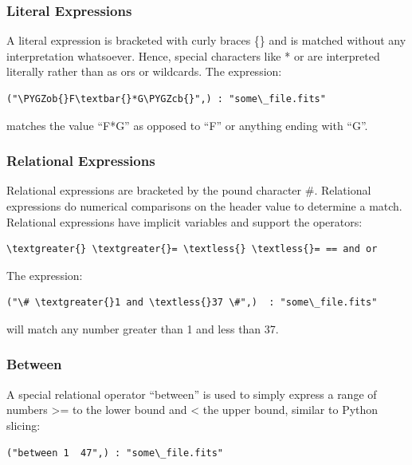 \documentclass[letterpaper,10pt,english]{sphinxmanual}
\def\PYGZob{\char`\{}
\def\PYGZcb{\char`\}}
\begin{document}
\subsubsection{Literal Expressions}
\label{rmap_syntax:literal-expressions}
A literal expression is bracketed with curly braces \{\} and is matched without
any interpretation whatsoever.   Hence,  special characters like * or \textbar{} are
interpreted literally rather than as ors or wildcards.  The expression:

\begin{Verbatim}[commandchars=\\\{\}]
("\PYGZob{}F\textbar{}*G\PYGZcb{}",) : "some\_file.fits"
\end{Verbatim}

matches the value ``F\textbar{}*G'' as opposed to ``F'' or anything ending with ``G''.


\subsubsection{Relational Expressions}
\label{rmap_syntax:relational-expressions}
Relational expressions are bracketed by the pound character \#.   Relational
expressions do numerical comparisons on the header value to determine a match.
Relational expressions have implicit variables and support the operators:

\begin{Verbatim}[commandchars=\\\{\}]
\textgreater{} \textgreater{}= \textless{} \textless{}= == and or
\end{Verbatim}

The expression:

\begin{Verbatim}[commandchars=\\\{\}]
("\# \textgreater{}1 and \textless{}37 \#",)  : "some\_file.fits"
\end{Verbatim}

will match any number greater than 1 and less than 37.


\subsubsection{Between}
\label{rmap_syntax:between}
A special relational operator ``between'' is used to simply express a range
of numbers \textgreater{}= to the lower bound and \textless{} the upper bound,  similar to Python
slicing:

\begin{Verbatim}[commandchars=\\\{\}]
("between 1  47",) : "some\_file.fits"
\end{Verbatim}
\end{document}
